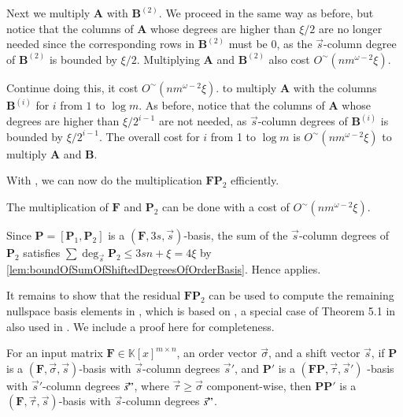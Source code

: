 \begin{pf}
Next we multiply $\mathbf{A}$ with $\mathbf{B}^{(2)}$. We proceed
in the same way as before, but notice that the columns of $\mathbf{A}$
whose degrees are higher than $\xi/2$ are no longer needed since
the corresponding rows in $\mathbf{B}^{(2)}$ must be 0, as the $\vec{s}$-column
degree of $\mathbf{B}^{(2)}$ is bounded by $\xi/2$. Multiplying
$\mathbf{A}$ and $\mathbf{B}^{(2)}$ also cost $O^{\sim}\left(nm^{\omega-2}\xi\right)$.

Continue doing this, it cost $O^{\sim}\left(nm^{\omega-2}\xi\right)$.
to multiply $\mathbf{A}$ with the columns $\mathbf{B}^{(i)}$ for
$i$ from $1$ to $\log m$.  As before, notice that the columns of
$\mathbf{A}$ whose degrees are higher than $\xi/2^{i-1}$ are not
needed, as $\vec{s}$-column degrees of $\mathbf{B}^{(i)}$ is bounded
by $\xi/2^{i-1}$. The overall cost for $i$ from 1 to $\log m$ is
$O^{\sim}\left(nm^{\omega-2}\xi\right)$ to multiply $\mathbf{A}$
and $\mathbf{B}$. 
\end{pf}
With , we can now do the
multiplication $\mathbf{F}\mathbf{P}_{2}$ efficiently.
\begin{cor}
\label{cor:multiplyingFP2}The multiplication of $\mathbf{F}$ and
$\mathbf{P}_{2}$ can be done with a cost of $O^{\sim}\left(nm^{\omega-2}\xi\right)$.\end{cor}
\begin{pf}
Since $\mathbf{P}=[\mathbf{P}_{1},\mathbf{P}_{2}]$ is a $(\mathbf{F},3s,\vec{s})$-basis,
the sum of the $\vec{s}$-column degrees of $\mathbf{P}_{2}$ satisfies
$\sum\deg_{\vec{s}}\mathbf{P}_{2}\le3sn+\xi=4\xi$ by \ref{lem:boundOfSumOfShiftedDegreesOfOrderBasis}.
Hence  applies.
\end{pf}
It remains to show that the residual $\mathbf{F}\mathbf{P}_{2}$ can
be used to compute the remaining nullspace basis elements in ,
which is based on , a
special case of Theorem 5.1 in \textbf{\citep{BL1997} }also used
in \citep{za2009}. We include a proof here for completeness.
\begin{lem}
\label{lem:continueComputingOrderBasis}For an input matrix $\mathbf{F}\in\mathbb{K}\left[x\right]^{m\times n}$,
an order vector $\vec{\sigma}$, and a shift vector $\vec{s}$, if
$\mathbf{P}$ is a $\left(\mathbf{F},\vec{\sigma},\vec{s}\right)$-basis
with $\vec{s}$-column degrees $\vec{s}'$, and $\mathbf{P}'$ is
a $(\mathbf{F}\mathbf{P},\vec{\tau},\vec{s}')$ -basis with $\vec{s}'$-column
degrees $\vec{s}"$, where $\vec{\tau}\ge\vec{\sigma}$ component-wise,
then $\mathbf{P}\mathbf{P}'$ is a $(\mathbf{F},\vec{\tau},\vec{s})$-basis
with $\vec{s}$-column degrees $\vec{s}"$.\end{lem}
